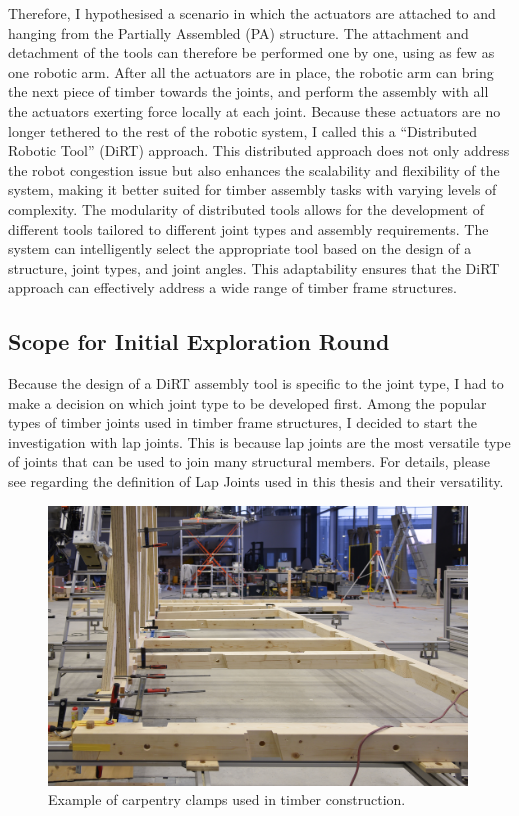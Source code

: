 Therefore, I hypothesised a scenario in which the actuators are attached to and hanging from the Partially Assembled (PA) structure. The attachment and detachment of the tools can therefore be performed one by one, using as few as one robotic arm. After all the actuators are in place, the robotic arm can bring the next piece of timber towards the joints, and perform the assembly with all the actuators exerting force locally at each joint. Because these actuators are no longer tethered to the rest of the robotic system, I called this a “Distributed Robotic Tool” (DiRT) approach.
This distributed approach does not only address the robot congestion issue but also enhances the scalability and flexibility of the system, making it better suited for timber assembly tasks with varying levels of complexity. The modularity of distributed tools allows for the development of different tools tailored to different joint types and assembly requirements. The system can intelligently select the appropriate tool based on the design of a structure, joint types, and joint angles. This adaptability ensures that the DiRT approach can effectively address a wide range of timber frame structures.

\subsection{Scope for Initial Exploration Round}
\label{subsection:exploration-1-scope-for-initial-exploration-round}

Because the design of a DiRT assembly tool is specific to the joint type, I had to make a decision on which joint type to be developed first. Among the popular types of timber joints used in timber frame structures, I decided to start the investigation with lap joints. This is because lap joints are the most versatile type of joints that can be used to join many structural members. For details, please see  regarding the definition of Lap Joints used in this thesis and their versatility.

\begin{figure}
    \centering
    \includegraphics[width=0.99\textwidth]{images/04-1+2/clamp-inspiration.jpeg}
    \caption{Example of carpentry clamps used in timber construction.}
    \label{fig:clamp-inspiration}
\end{figure}

